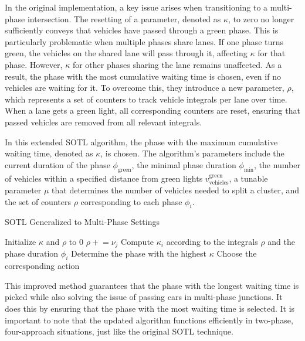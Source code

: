 In the original implementation, a key issue arises when transitioning to a multi-phase intersection. The resetting of a parameter, denoted as \(\kappa\), to zero no longer sufficiently conveys that vehicles have passed through a green phase. This is particularly problematic when multiple phases share lanes. If one phase turns green, the vehicles on the shared lane will pass through it, affecting \(\kappa\) for that phase. However, \(\kappa\) for other phases sharing the lane remains unaffected. As a result, the phase with the most cumulative waiting time is chosen, even if no vehicles are waiting for it. To overcome this, they introduce a new parameter, \(\rho\), which represents a set of counters to track vehicle integrals per lane over time. When a lane gets a green light, all corresponding counters are reset, ensuring that passed vehicles are removed from all relevant integrals.

In this extended SOTL algorithm, the phase with the maximum cumulative waiting time, denoted as \(\kappa\), is chosen. The algorithm's parameters include the current duration of the phase \(\phi_{\text{green}}\), the minimal phase duration \(\phi_{\text{min}}\), the number of vehicles within a specified distance from green lights \(v_{\text{vehicles}}^{\text{green}}\), a tunable parameter \(\mu\) that determines the number of vehicles needed to split a cluster, and the set of counters \(\rho\) corresponding to each phase \(\phi_i\).

\begin{algorithm}
\caption{SOTL Generalized to Multi-Phase Settings\cite{kanis2021deep}}
\label{alg:sotl_multi_phase}
\begin{algorithmic}
\State Initialize \(\kappa\) and \(\rho\) to 0
        \State \(\rho \mathrel{+}= \nu_j\)
    \EndFor
        \State Compute \(\kappa_i\) according to the integrals \(\rho\) and the phase duration \(\phi_i\)
    \EndFor
        \State Determine the phase with the highest \(\kappa\)
        \State Choose the corresponding action
    \EndIf
\EndFor
\end{algorithmic}
\end{algorithm}

This improved method guarantees that the phase with the longest waiting time is picked while also solving the issue of passing cars in multi-phase junctions. It does this by ensuring that the phase with the most waiting time is selected. It is important to note that the updated algorithm functions efficiently in two-phase, four-approach situations, just like the original SOTL technique.



